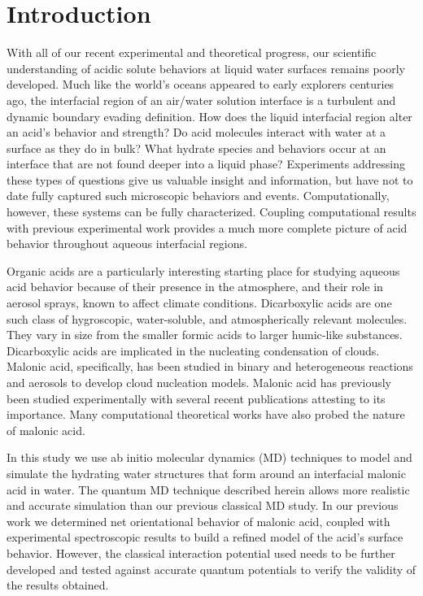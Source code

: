 \section {Introduction}

With all of our recent experimental and theoretical progress, our scientific understanding of acidic solute behaviors at liquid water surfaces remains poorly developed. Much like the world's oceans appeared to early explorers centuries ago, the interfacial region of an air/water solution interface is a turbulent and dynamic boundary evading definition. How does the liquid interfacial region alter an acid's behavior and strength? Do acid molecules interact with water at a surface as they do in bulk? What hydrate species and behaviors occur at an interface that are not found deeper into a liquid phase? Experiments addressing these types of questions give us valuable insight and information, but have not to date fully captured such microscopic behaviors and events. Computationally, however, these systems can be fully characterized. Coupling computational results with previous experimental work provides a much more complete picture of acid behavior throughout aqueous interfacial regions.

Organic acids are a particularly interesting starting place for studying aqueous acid behavior because of their presence in the atmosphere,\cite{Kanakdou2005} and their role in aerosol sprays, known to affect climate conditions.\cite{Finlayson-Pitts2000,Seinfeld1998} Dicarboxylic acids are one such class of hygroscopic, water-soluble, and atmospherically relevant molecules.\cite{Peng2001,Kawamura1993,Kawamura1996,Kawamura1999,Senpere1994,Senpere1996,Aggarawal2008,Hsieh2007,Hsieh2009,Pavuluri2010} They vary in size from the smaller formic acids to larger humic-like substances.\cite{Chebbi1996,Badgerr2005} Dicarboxylic acids are implicated in the nucleating condensation of clouds.\cite{Cruz1997} Malonic acid, specifically, has been studied in binary and heterogeneous reactions and aerosols to develop cloud nucleation models.\cite{Giebl2002,Finlayson-Pitts2009} Malonic acid has previously been studied experimentally with several recent publications attesting to its importance.\cite{Parsons2004,Braban2003,Hansen2004,Hyvarinen2006,Riipinen2007} Many computational theoretical works have also probed the nature of malonic acid.\cite{Nguyen2005,Merchan1984,MoreReferences}

In this study we use ab initio molecular dynamics (MD) techniques to model and simulate the hydrating water structures that form around an interfacial malonic acid in water. The quantum MD technique described herein allows more realistic and accurate simulation than our previous classical MD study.\cite{Blower2012} In our previous work we determined net orientational behavior of malonic acid, coupled with experimental spectroscopic results to build a refined model of the acid's surface behavior. However, the classical interaction potential used needs to be further developed and tested against accurate quantum potentials to verify the validity of the results obtained.

